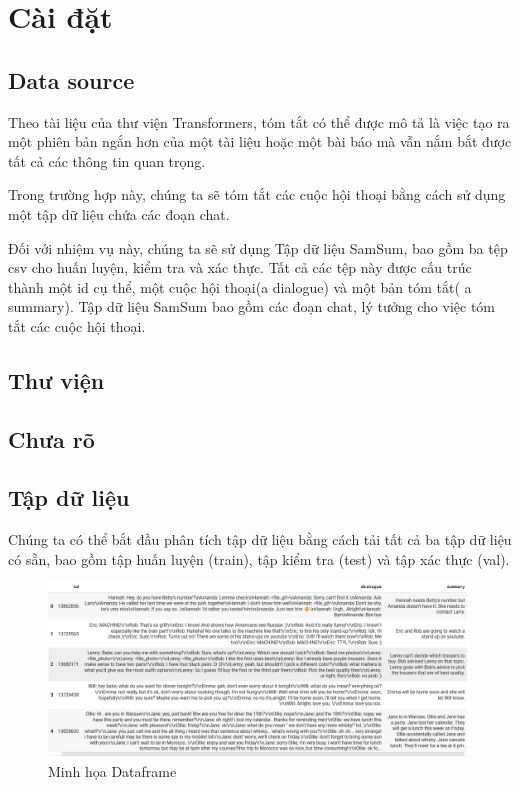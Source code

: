\chapter{Cài đặt}
\label{Chapter2}

\section{Data source}

Theo tài liệu của thư viện Transformers, tóm tắt có thể được mô tả là việc tạo ra một phiên bản ngắn hơn của một tài liệu hoặc một bài báo mà vẫn nắm bắt được tất cả các thông tin quan trọng.

Trong trường hợp này, chúng ta sẽ tóm tắt các cuộc hội thoại bằng cách sử dụng một tập dữ liệu chứa các đoạn chat.

Đối với nhiệm vụ này, chúng ta sẽ sử dụng Tập dữ liệu SamSum, bao gồm ba tệp csv cho huấn luyện, kiểm tra và xác thực. Tất cả các tệp này được cấu trúc thành một id cụ thể, một cuộc hội thoại(a dialogue) và một bản tóm tắt( a summary). Tập dữ liệu SamSum bao gồm các đoạn chat, lý tưởng cho việc tóm tắt các cuộc hội thoại.\\



\section{Thư viện}



\section{Chưa rõ}



\section{Tập dữ liệu}

Chúng ta có thể bắt đầu phân tích tập dữ liệu bằng cách tải tất cả ba tập dữ liệu có sẵn, bao gồm tập huấn luyện (train), tập kiểm tra (test) và tập xác thực (val).\\



\begin{figure}[htp]
    \centering
    \includegraphics[scale=.5]{images/df.png}
    \caption{Minh họa Dataframe}
    \end{figure}
\pagebreak

